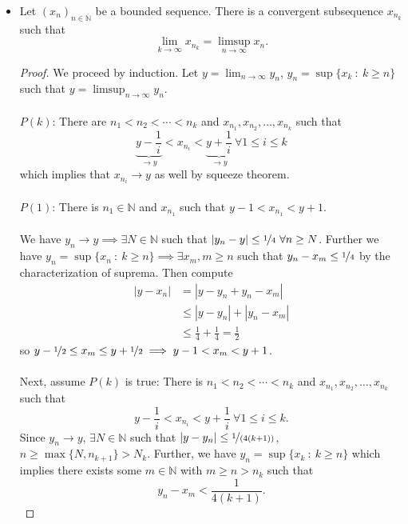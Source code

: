 \documentclass{article}
\newcommand{\N}{\mathbb{N}}
\newcommand{\seq}[2]{(#1_{#2})_{#2 \in \N}}
\newcommand{\?}{\stackrel{?}{=}}
\theoremstyle{definition} %
\begin{document}
\begin{itemize}
\begin{proof}
    \end{proof}
    \item[]
    \begin{lemma}
        Let $\seq{x}{n}$ be a bounded sequence. There is a convergent subsequence $x_{n_k}$ such that
    $$\lim_{k \to \infty} x_{n_k} = \limsup_{n \to \infty} x_n.$$
    \end{lemma}
    \begin{proof}
        We proceed by induction. Let $y = \lim_{n \to \infty} y_n$, $y_n = \sup\{x_k \ : \ k \geq n\}$ such that $y = \limsup_{n \to \infty} y_n$. \\\\
        $P(k)$: There are $n_1 < n_2 < \cdots < n_k$ and $x_{n_1}, x_{n_2}, \ldots, x_{n_k}$ such that
        $$\underbrace{y - \frac{1}{i}}_{\rightarrow y} < x_{n_i} < \underbrace{y + \frac{1}{i}}_{\rightarrow y} \ \forall 1 \leq i \leq k$$
        which implies that $x_{n_i} \rightarrow y$ as well by squeeze theorem. \\\\
        $P(1)$: There is $n_1 \in \N$ and $x_{n_1}$ such that $y - 1 < x_{n_1} < y + 1$. \\\\
        We have $y_n \rightarrow y \implies \exists N \in \N$ such that $|y_n - y| \leq \nicefrac{1}{4} \ \forall n \geq N$. Further we have $y_n = \sup\{x_n \ : \ k \geq n\} \implies \exists x_m, m \geq n$ such that $y_n - x_m \leq \nicefrac{1}{4}$ by the characterization of suprema. Then compute
        \begin{align*}
            |y - x_n| &= |y - y_n + y_n - x_m| \\
            &\leq |y - y_n| + |y_n - x_m| \\
            &\leq \frac{1}{4} + \frac{1}{4} = \frac{1}{2}
        \end{align*}
        so $y - \nicefrac{1}{2} \leq x_m \leq y + \nicefrac{1}{2} \implies y - 1 < x_m < y + 1$. \\\\ 
        Next, assume $P(k)$ is true: There is $n_1 < n_2 < \cdots < n_k$ and $x_{n_1}, x_{n_2}, \ldots, x_{n_k}$ such that
        $$y - \frac{1}{i} < x_{n_i} < y + \frac{1}{i} \ \forall 1 \leq i \leq k.$$
        Since $y_n \rightarrow y$, $\exists N \in \N$ such that $|y - y_n| \leq \nicefrac{1}{(4(k + 1))}$, $n \geq \max\{N, n_{k + 1}\} > N_k$. Further, we have $y_n = \sup\{x_k \ : \ k \geq n\}$ which implies there exists some $m \in \N$ with $m \geq n > n_k$ such that
        $$y_n - x_m < \frac{1}{4(k + 1)}.$$

\end{proof}
\end{itemize}
\end{document}
